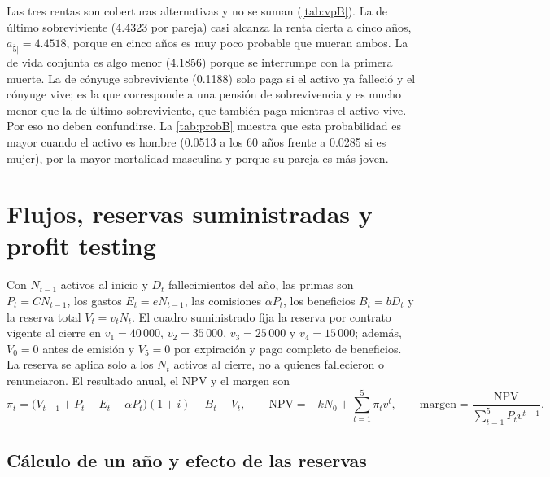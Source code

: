 \documentclass[10pt,a4paper]{article}
\numberwithin{equation}{section}
\newcommand{\tabla}[1]{}
\begin{document}
	\begin{table}[htbp]
		\centering\small
		\tabla{B_ejemplo_probabilidades}
		\caption{Edades asignadas y probabilidades \eqref{eq:estatus} al cierre del año 5 para cohortes de ejemplo.}\label{tab:probB}
	\end{table}

	Las tres rentas son coberturas alternativas y no se suman (\cref{tab:vpB}). La de último sobreviviente (4.4323 por pareja) casi alcanza la renta cierta a cinco años, \(a_{\overline{5}|}=4.4518\), porque en cinco años es muy poco probable que mueran ambos. La de vida conjunta es algo menor (4.1856) porque se interrumpe con la primera muerte. La de cónyuge sobreviviente (0.1188) solo paga si el activo ya falleció y el cónyuge vive; es la que corresponde a una pensión de sobrevivencia y es mucho menor que la de último sobreviviente, que también paga mientras el activo vive. Por eso no deben confundirse. La \cref{tab:probB} muestra que esta probabilidad es mayor cuando el activo es hombre (0.0513 a los 60 años frente a 0.0285 si es mujer), por la mayor mortalidad masculina y porque su pareja es más joven.

	\section{Flujos, reservas suministradas y profit testing}\label{sec:C}

	Con \(N_{t-1}\) activos al inicio y \(D_t\) fallecimientos del año, las primas son \(P_t=CN_{t-1}\), los gastos \(E_t=eN_{t-1}\), las comisiones \(\alpha P_t\), los beneficios \(B_t=bD_t\) y la reserva total \(V_t=v_tN_t\). El cuadro suministrado fija la reserva por contrato vigente al cierre en \(v_1=40\,000\), \(v_2=35\,000\), \(v_3=25\,000\) y \(v_4=15\,000\); además, \(V_0=0\) antes de emisión y \(V_5=0\) por expiración y pago completo de beneficios. La reserva se aplica solo a los \(N_t\) activos al cierre, no a quienes fallecieron o renunciaron. El resultado anual, el NPV y el margen son
	\begin{equation}\label{eq:profit}
		\pi_t=\bigl(V_{t-1}+P_t-E_t-\alpha P_t\bigr)(1+i)-B_t-V_t,\qquad
		\mathrm{NPV}=-kN_0+\sum_{t=1}^{5}\pi_t v^t,\qquad
		\text{margen}=\frac{\mathrm{NPV}}{\sum_{t=1}^{5}P_t v^{t-1}}.
	\end{equation}

	\subsection{Cálculo de un año y efecto de las reservas}
\end{document}
